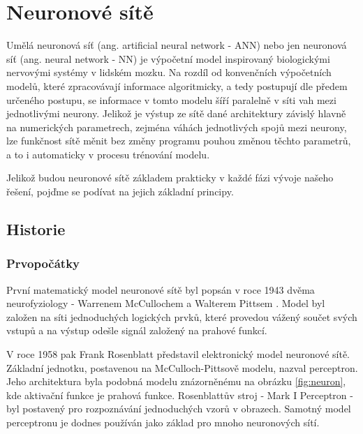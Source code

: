 \chapter{Neuronové sítě}
\label{chap:NN}

Umělá neuronová síť (ang. artificial neural network - ANN) nebo jen neuronová
síť (ang. neural network - NN) je výpočetní model inspirovaný biologickými
nervovými systémy v lidském mozku. Na rozdíl od konvenčních výpočetních modelů,
které zpracovávají informace algoritmicky, a tedy postupují dle předem určeného
postupu, se informace v tomto modelu šíří paralelně v síti vah mezi
jednotlivými neurony. Jelikož je výstup ze sítě dané architektury závislý
hlavně na numerických parametrech, zejména váhách jednotlivých spojů mezi
neurony, lze funkčnost sítě měnit bez změny programu pouhou změnou těchto
parametrů, a to i automaticky v procesu trénování modelu.

Jelikož budou neuronové sítě základem prakticky v každé fázi vývoje našeho
řešení, pojďme se podívat na jejich základní principy.

\section{Historie}
\label{sec:NN_History}

\subsection{Prvopočátky}
První matematický model neuronové sítě byl popsán v roce 1943 dvěma
neurofyziology - Warrenem McCullochem a Walterem Pittsem \cite{McCulloch1943}.
Model byl založen na síti jednoduchých logických prvků, které provedou vážený
součet svých vstupů a na výstup odešle signál založený na prahové funkcí.

V roce 1958 pak Frank Rosenblatt představil elektronický model neuronové sítě.
Základní jednotku, postavenou na McCulloch-Pittsově modelu, nazval perceptron.
\cite{Rosenblatt1958} Jeho architektura byla podobná modelu znázorněnému na
obrázku \ref{fig:neuron}, kde aktivační funkce je prahová funkce. Rosenblattův
stroj - Mark I Perceptron - byl postavený pro rozpoznávání jednoduchých vzorů v
obrazech.
Samotný model perceptronu je dodnes používán jako základ pro mnoho neuronových
sítí.


